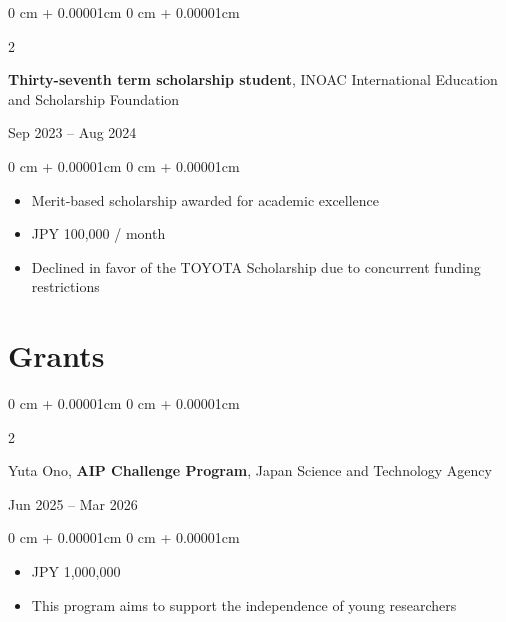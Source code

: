 \documentclass[11pt, letterpaper]{article}
\newenvironment{highlights}{
    \begin{itemize}[
        topsep=0.0cm,
        parsep=0.0cm,
        partopsep=0pt,
        itemsep=0pt,
        leftmargin=10pt
    ]
}{
    \end{itemize}
} %
\newenvironment{onecolentry}{
    \begin{adjustwidth}{
        0 cm + 0.00001cm
    }{
        0 cm + 0.00001cm
    }
}{
    \end{adjustwidth}
} %
\newenvironment{twocolentry}[2][]{
    \onecolentry
    \def\secondColumn{#2}
    \setcolumnwidth{\fill, 3.5cm}
    \begin{paracol}{2}
}{
    \switchcolumn \raggedleft \secondColumn
    \end{paracol}
    \endonecolentry
} %
\begin{document}
      \vspace{0.30cm}
      \begin{samepage}
        \begin{twocolentry}{Sep 2023 -- Aug 2024}
          \textbf{Thirty-seventh term scholarship student}, INOAC International Education and Scholarship Foundation
        \end{twocolentry}
        \vspace{0.05 cm}
        \begin{onecolentry}
          \begin{highlights}
            \item Merit-based scholarship awarded for academic excellence
            \item JPY 100,000 / month
            \item Declined in favor of the TOYOTA Scholarship due to concurrent funding restrictions
          \end{highlights}
        \end{onecolentry}
      \end{samepage}

    \section{Grants}
      \begin{samepage}
        \begin{twocolentry}{Jun 2025 -- Mar 2026}
          Yuta Ono, \textbf{AIP Challenge Program}, Japan Science and Technology Agency
        \end{twocolentry}
        \vspace{0.10 cm}
        \begin{onecolentry}
          \begin{highlights}
            \item JPY 1,000,000
            \item This program aims to support the independence of young researchers
          \end{highlights}
        \end{onecolentry}
      \end{samepage}
\end{document}
